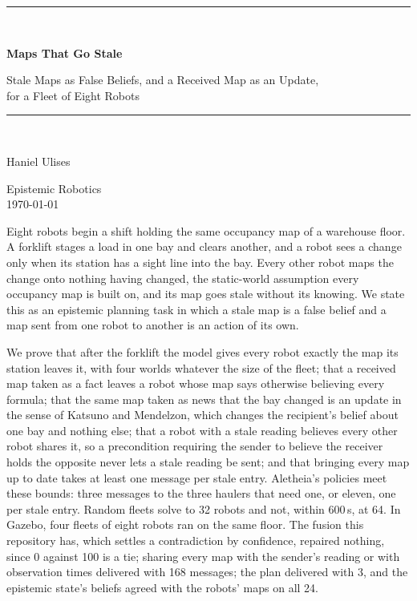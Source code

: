 \documentclass[11pt,a4paper]{article}
\theoremstyle{definition}
\begin{document}
\begin{titlepage}
\centering
\vspace*{2.4cm}
{\color{rulegrey}\rule{\textwidth}{0.8pt}}\\[0.9cm]
{\LARGE\bfseries Maps That Go Stale\par}
\vspace{0.5cm}
{\large\color{slate} Stale Maps as False Beliefs, and a Received Map as an Update,\\
for a Fleet of Eight Robots\par}
\vspace{0.7cm}
{\color{rulegrey}\rule{\textwidth}{0.8pt}}\\[1.4cm]

{\large Haniel Ulises\par}
\vspace{0.3cm}
{\color{slate} Epistemic Robotics}\\
\vspace{0.15cm}
{\color{slate}\today}

\vfill
{\color{slate}\small
Eight robots begin a shift holding the same occupancy map of a warehouse floor.
A forklift stages a load in one bay and clears another, and a robot sees a
change only when its station has a sight line into the bay. Every other robot
maps the change onto nothing having changed, the static-world assumption every
occupancy map is built on, and its map goes stale without its knowing. We state
this as an epistemic planning task in which a stale map is a false belief and a
map sent from one robot to another is an action of its own.

\vspace{0.6em}
We prove that after the forklift the model gives every robot exactly the map its
station leaves it, with four worlds whatever the size of the fleet; that a
received map taken as a fact leaves a robot whose map says otherwise believing
every formula; that the same map taken as news that the bay changed is an update
in the sense of Katsuno and Mendelzon, which changes the recipient's belief about
one bay and nothing else; that a robot with a stale reading believes every other
robot shares it, so a precondition requiring the sender to believe the receiver
holds the opposite never lets a stale reading be sent; and that bringing every
map up to date takes at least one message per stale entry. Aletheia's policies
meet these bounds: three messages to the three haulers that need one, or eleven,
one per stale entry. Random fleets solve to 32 robots and not, within 600\,s, at
64. In Gazebo, four fleets of eight robots ran on the same floor. The fusion this
repository has, which settles a contradiction by confidence, repaired nothing,
since 0 against 100 is a tie; sharing every map with the sender's reading or with
observation times delivered with 168 messages; the plan delivered with 3, and the
epistemic state's beliefs agreed with the robots' maps on all 24.}
\vspace{1.2cm}
\end{titlepage}
\end{document}

